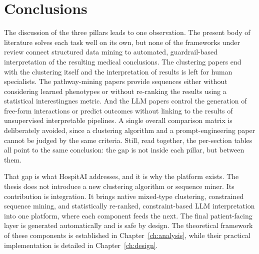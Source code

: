 \section{Conclusions}\label{sec:rw_synthesis}

The discussion of the three pillars leads to one observation.
The present body of literature solves each task well on its own, but none of the frameworks under review connect structured data mining to automated, guardrail-based interpretation of the resulting medical conclusions.
The clustering papers end with the clustering itself and the interpretation of results is left for human specialists. The pathway-mining papers provide sequences either without considering learned phenotypes or without re-ranking the results using a statistical interestingnes metric. And the LLM papers control the generation of free-form interactions or predict outcomes without linking to the results of unsupervised interpretable pipelines.
A single overall comparison matrix is deliberately avoided, since a clustering algorithm and a prompt-engineering paper cannot be judged by the same criteria. Still, read together, the per-section tables all point to the same conclusion: the gap is not inside each pillar, but between them.

That gap is what HospitAI addresses, and it is why the platform exists.
The thesis does not introduce a new clustering algorithm or sequence miner. Its contribution is integration. It brings native mixed-type clustering, constrained sequence mining, and statistically re-ranked, constraint-based LLM interpretation into one platform, where each component feeds the next. The final patient-facing layer is generated automatically and is safe by design.
The theoretical framework of these components is established in Chapter~\ref{ch:analysis}, while their practical implementation is detailed in Chapter~\ref{ch:design}.
